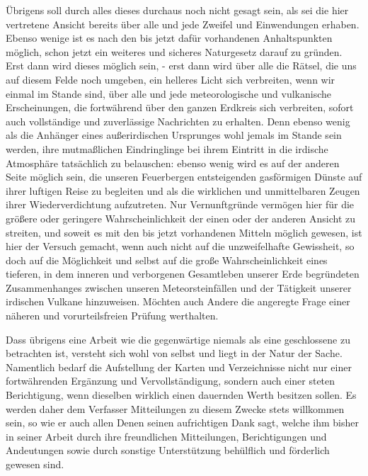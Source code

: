\documentclass[a4paper, 8pt, oneside, polutonikogreek, german]{article}
\begin{document}
Übrigens soll durch alles dieses durchaus noch nicht gesagt sein, als sei die hier vertretene Ansicht bereits über alle und jede Zweifel und Einwendungen erhaben. Ebenso wenige ist es nach den bis jetzt dafür vorhandenen Anhaltspunkten möglich, schon jetzt ein weiteres und sicheres Naturgesetz darauf zu gründen. Erst dann wird dieses möglich sein, - erst dann wird über alle die Rätsel, die uns auf diesem Felde noch umgeben, ein helleres Licht sich verbreiten, wenn wir einmal im Stande sind, über alle und jede meteorologische und vulkanische Erscheinungen, die fortwährend über den ganzen Erdkreis sich verbreiten, sofort auch vollständige und zuverlässige Nachrichten zu erhalten. Denn ebenso wenig als die Anhänger eines außerirdischen Ursprunges wohl jemals im Stande sein werden, ihre mutmaßlichen Eindringlinge bei ihrem Eintritt in die irdische Atmosphäre tatsächlich zu belauschen: ebenso wenig wird es auf der anderen Seite möglich sein, die unseren Feuerbergen entsteigenden gasförmigen Dünste auf ihrer luftigen Reise zu begleiten und als die wirklichen und unmittelbaren Zeugen ihrer Wiederverdichtung aufzutreten. Nur Vernunftgründe vermögen hier für die größere oder geringere Wahrscheinlichkeit der einen oder der anderen Ansicht zu streiten, und soweit es mit den bis jetzt vorhandenen Mitteln möglich gewesen, ist hier der Versuch gemacht, wenn auch nicht auf die unzweifelhafte Gewissheit, so doch auf die Möglichkeit und selbst auf die große Wahrscheinlichkeit eines tieferen, in dem inneren und verborgenen Gesamtleben unserer Erde begründeten Zusammenhanges zwischen unseren Meteorsteinfällen und der Tätigkeit unserer irdischen Vulkane hinzuweisen. Möchten auch Andere die angeregte Frage einer näheren und vorurteilsfreien Prüfung werthalten.

Dass übrigens eine Arbeit wie die gegenwärtige niemals als eine geschlossene zu betrachten ist, versteht sich wohl von selbst und liegt in der Natur der Sache. Namentlich bedarf die Aufstellung der Karten und Verzeichnisse nicht nur einer fortwährenden Ergänzung und Vervollständigung, sondern auch einer steten Berichtigung, wenn dieselben wirklich einen dauernden Werth besitzen sollen. Es werden daher dem Verfasser Mitteilungen zu diesem Zwecke stets willkommen sein, so wie er auch allen Denen seinen aufrichtigen Dank sagt, welche ihm bisher in seiner Arbeit durch ihre freundlichen Mitteilungen, Berichtigungen und Andeutungen sowie durch sonstige Unterstützung behülflich und förderlich gewesen sind.
\clearpage
\vspace*{\fill}
\end{document}
